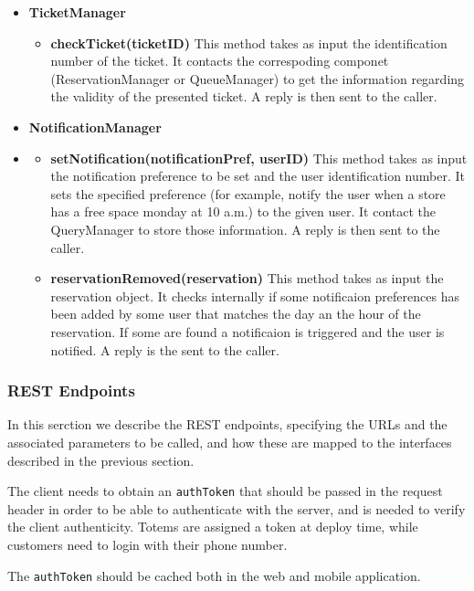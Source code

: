 \begin{itemize}
    \item \textbf{TicketManager}
    \begin{itemize}
        \item \textbf{checkTicket(ticketID)}
        This method takes as input the identification number of the ticket. It contacts the correspoding componet (ReservationManager or QueueManager) to get the information regarding the validity of the presented ticket. A reply is then sent to the caller.
    \end{itemize}

    \item \textbf{NotificationManager}
    \item \begin{itemize}
        \item \textbf{setNotification(notificationPref, userID)}
        This method takes as input the notification preference to be set and the user identification number. It sets the specified preference (for example, notify the user when a store has a free space monday at 10 a.m.) to the given user. It contact the QueryManager to store those information. A reply is then sent to the caller. 
        \item \textbf{reservationRemoved(reservation)}
        This method takes as input the reservation object. It checks internally if some notificaion preferences has been added by some user that matches the day an the hour of the reservation. 
        If some are found a notificaion is triggered and the user is notified. A reply is the sent to the caller.
    \end{itemize}
\end{itemize}

\subsubsection{REST Endpoints}

In this serction we describe the REST endpoints, specifying the URLs and the associated parameters to be called, and how these are mapped to the interfaces described in the previous section.

The client needs to obtain an \texttt{authToken} that should be passed in the request header in order to be able to authenticate with the server, and is needed to verify the client authenticity.
Totems are assigned a token at deploy time, while customers need to login with their phone number.

The \texttt{authToken} should be cached both in the web and mobile application.

